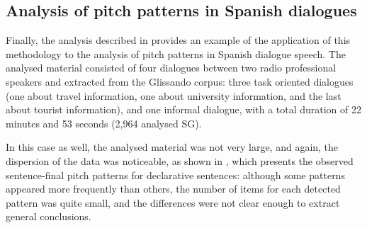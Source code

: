 \documentclass[output=paper]{langsci/langscibook}
\begin{document}
\begin{table}[p]

\caption{Most frequent patterns appearing in sentence-final position (\citealt{GarridoRustullet2011}). The ``ENUNCIATIVA'' label indicates that patterns appear in declarative sentences.}
\label{tab:gar:14}
\end{table}\clearpage

\subsection{Analysis of pitch patterns in Spanish dialogues}

Finally, the analysis described in \citet{GarridoRustullet2011} provides an example of the application of this methodology to the analysis of pitch patterns in Spanish dialogue speech. The analysed material consisted of four dialogues between two radio professional speakers and extracted from the Glissando corpus: three task oriented dialogues (one about travel information, one about university information, and the last about tourist information), and one informal dialogue, with a total duration of 22 minutes and 53 seconds (2,964 analysed SG). 


In this case as well, the analysed material was not very large, and again, the dispersion of the data was noticeable, as shown in , which presents the observed sentence-final pitch patterns for declarative sentences: although some patterns appeared more frequently than others, the number of items for each detected pattern was quite small, and the differences were not clear enough to extract general conclusions.
\end{document}
